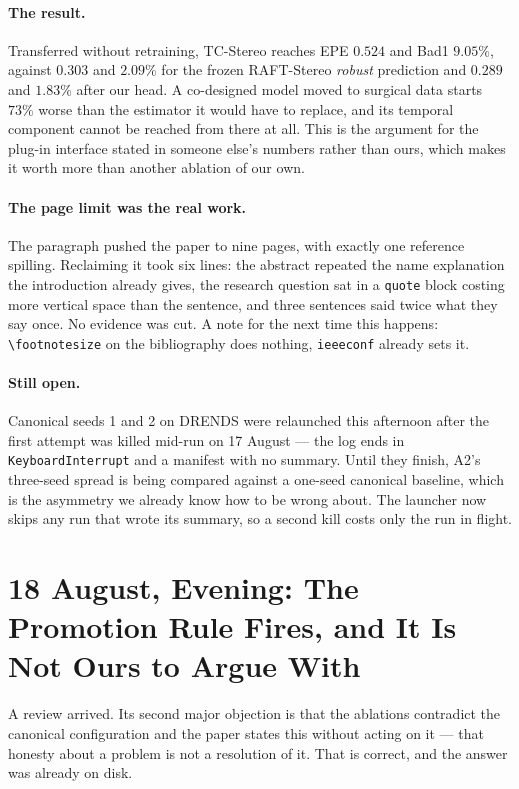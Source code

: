 \documentclass[11pt,a4paper]{article}
\begin{document}
\paragraph{The result.} Transferred without retraining, TC-Stereo reaches
EPE $0.524$ and Bad1 $9.05\%$, against $0.303$ and $2.09\%$ for the frozen
RAFT-Stereo \emph{robust} prediction and $0.289$ and $1.83\%$ after our
head. A co-designed model moved to surgical data starts $73\%$ worse than
the estimator it would have to replace, and its temporal component cannot
be reached from there at all. This is the argument for the plug-in
interface stated in someone else's numbers rather than ours, which makes it
worth more than another ablation of our own.

\paragraph{The page limit was the real work.} The paragraph pushed the
paper to nine pages, with exactly one reference spilling. Reclaiming it
took six lines: the abstract repeated the name explanation the introduction
already gives, the research question sat in a \texttt{quote} block costing
more vertical space than the sentence, and three sentences said twice what
they say once. No evidence was cut. A note for the next time this happens:
\texttt{\textbackslash footnotesize} on the bibliography does nothing,
\texttt{ieeeconf} already sets it.

\paragraph{Still open.} Canonical seeds 1 and 2 on DRENDS were relaunched
this afternoon after the first attempt was killed mid-run on 17 August ---
the log ends in \texttt{KeyboardInterrupt} and a manifest with no summary.
Until they finish, A2's three-seed spread is being compared against a
one-seed canonical baseline, which is the asymmetry we already know how to
be wrong about. The launcher now skips any run that wrote its summary, so a
second kill costs only the run in flight.


\section*{18 August, Evening: The Promotion Rule Fires, and It Is Not Ours to Argue With}

A review arrived. Its second major objection is that the ablations contradict
the canonical configuration and the paper states this without acting on it ---
that honesty about a problem is not a resolution of it. That is correct, and the
answer was already on disk.
\end{document}
